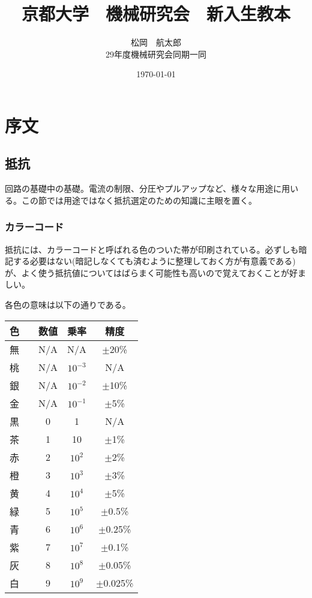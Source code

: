 \documentclass[a4paper,titlepage]{ujarticle}
\title{京都大学　機械研究会　新入生教本}
\date{\today}
\author{松岡　航太郎\\29年度機械研究会同期一同}
\begin{document}
\maketitle
\section{序文}
\subsection{抵抗}
回路の基礎中の基礎。電流の制限、分圧やプルアップなど、様々な用途に用いる。この節では用途ではなく抵抗選定のための知識に主眼を置く。
\subsubsection{カラーコード}
抵抗には、カラーコードと呼ばれる色のついた帯が印刷されている。必ずしも暗記する必要はない(暗記しなくても済むように整理しておく方が有意義である)が、よく使う抵抗値についてはばらまく可能性も高いので覚えておくことが好ましい。

各色の意味は以下の通りである。

\begin{table}[H]
	\begin{tabular}{|cc|c|c|c|}\hline
		色&&数値&乗率&精度\\ \hline
		無&&N/A&N/A&$\pm$20\%\\ \hline
		桃&\cellcolor[rgb]{1,0.412,0.706}{　}&N/A&$10^{-3}$&N/A\\ \hline
		銀&\cellcolor[rgb]{0.753,0.753,0.753}{　}&N/A&$10^{-2}$&$\pm$10\%\\ \hline
		金&\cellcolor[rgb]{0.812,0.71,0.231}{　}&N/A&$10^{-1}$&$\pm$5\%\\ \hline
		黒&\cellcolor{black}{　}&0&1&N/A\\ \hline
		茶&\cellcolor[rgb]{0.647059,0.164706,0.164706}{　}&1&10&$\pm$1\%\\ \hline
		赤&\cellcolor{red}{　}&2&$10^2$&$\pm$2\%\\ \hline
		橙&\cellcolor[rgb]{0.894118,0.368627,0}{　}&3&$10^3$&$\pm$3\% \\ \hline
		黄&\cellcolor{yellow}{　}&4&$10^4$&$\pm$5\%\\ \hline
		緑&\cellcolor{green}{　}&5&$10^5$&$\pm$0.5\%\\ \hline
		青&\cellcolor{blue}{　}&6&$10^6$&$\pm$0.25\%\\ \hline
		紫&\cellcolor[rgb]{0.58,0,0.827}{　}&7&$10^7$&$\pm$0.1\%\\ \hline
		灰&\cellcolor[rgb]{0.627,0.627,0.627}{　}&8&$10^8$&$\pm$0.05\%\\ \hline
		白&\cellcolor[rgb]{1,1,1}{　}&9&$10^9$&$\pm$0.025\%\\ \hline
	\end{tabular}
\end{table}
\end{document}
